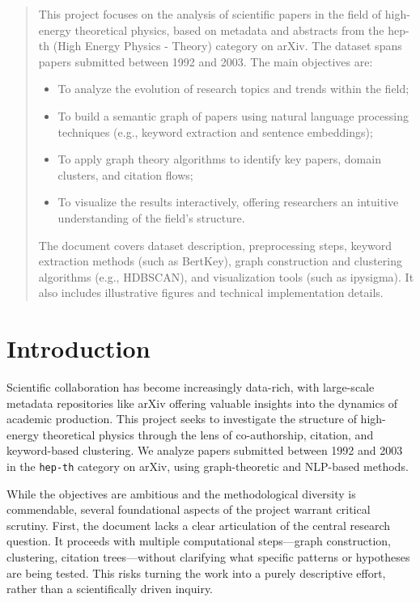 \documentclass[12pt]{article}
\title{}
\author{Yuguang YAO and Duc Khoi LE  \textit{\small Ecole Polytechnique}}
\date{May 2025}
\begin{document}
\maketitle

\begin{abstract}
This project focuses on the analysis of scientific papers in the field of high-energy theoretical physics, based on metadata and abstracts from the hep-th (High Energy Physics - Theory) category on arXiv. The dataset spans papers submitted between 1992 and 2003. The main objectives are:
\begin{itemize}
\item To analyze the evolution of research topics and trends within the field;
\item To build a semantic graph of papers using natural language processing techniques (e.g., keyword extraction and sentence embeddings);
\item To apply graph theory algorithms to identify key papers, domain clusters, and citation flows;
\item To visualize the results interactively, offering researchers an intuitive understanding of the field’s structure.
\end{itemize}
The document covers dataset description, preprocessing steps, keyword extraction methods (such as BertKey), graph construction and clustering algorithms (e.g., HDBSCAN), and visualization tools (such as ipysigma). It also includes illustrative figures and technical implementation details.
\end{abstract}

\tableofcontents

\newpage

\section{Introduction}

Scientific collaboration has become increasingly data-rich, with large-scale metadata repositories like arXiv offering valuable insights into the dynamics of academic production. This project seeks to investigate the structure of high-energy theoretical physics through the lens of co-authorship, citation, and keyword-based clustering. We analyze papers submitted between 1992 and 2003 in the \texttt{hep-th} category on arXiv, using graph-theoretic and NLP-based methods.

While the objectives are ambitious and the methodological diversity is commendable, several foundational aspects of the project warrant critical scrutiny. First, the document lacks a clear articulation of the central research question. It proceeds with multiple computational steps—graph construction, clustering, citation trees—without clarifying what specific patterns or hypotheses are being tested. This risks turning the work into a purely descriptive effort, rather than a scientifically driven inquiry.
\end{document}
